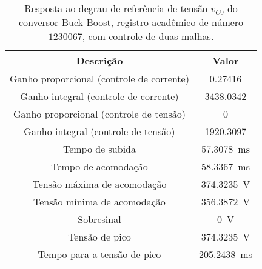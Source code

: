 \begin{table}[!ht]
\centering
\caption{Resposta ao degrau de referência de tensão $v_{C0}$ do conversor Buck-Boost, registro acadêmico de número $1230067$, com controle de duas malhas.}
\label{tab:resposta2malhas}
\begin{tabular}{@{}cc@{}}
\toprule
\textbf{Descrição} & \textbf{Valor}\\ \midrule
Ganho proporcional (controle de corrente) & \SI{0.27416}{}\\
Ganho integral (controle de corrente) & \SI{3438.0342}{}\\
Ganho proporcional (controle de tensão) & \SI{0}{}\\
Ganho integral (controle de tensão) & \SI{1920.3097}{}\\
Tempo de subida & \SI{57.3078}{\milli\s}\\
Tempo de acomodação & \SI{58.3367}{\milli\s}\\
Tensão máxima de acomodação & \SI{374.3235}{\V}\\
Tensão mínima de acomodação & \SI{356.3872}{\V}\\
Sobresinal & \SI{0}{\V}\\
Tensão de pico & \SI{374.3235}{\V}\\
Tempo para a tensão de pico & \SI{205.2438}{\milli\s}\\
\bottomrule
\end{tabular}
\end{table}

